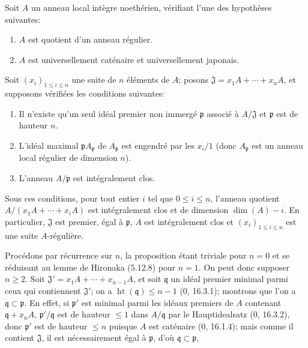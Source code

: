 \begin{corollary}[5.12.10]
\label{IV.2.s5.12.10-fr}
Soit $A$ un anneau local intègre noethérien, vérifiant l'une des hypothèses
suivantes:
\begin{enumerate}
\item[a)] $A$ est quotient d'un anneau régulier.
\item[b)] $A$ est universellement caténaire et universellement japonais.
\end{enumerate}
Soit $(x_i)_{1\leq i\leq n}$ une suite de $n$ éléments de $A$; posons
$\mathfrak J=x_1A+\cdots+x_nA$, et supposons vérifiées les conditions
suivantes:
\begin{enumerate}
\item[(i)] Il n'existe qu'un seul idéal premier non immergé $\mathfrak p$
associé à $A/\mathfrak J$ et $\mathfrak p$ est de hauteur $n$.
\item[(ii)] L'idéal maximal $\mathfrak pA_{\mathfrak p}$ de $A_{\mathfrak p}$
est engendré par les $x_i/1$ (donc $A_{\mathfrak p}$ est un anneau local
régulier de dimension $n$).
\item[(iii)] L'anneau $A/\mathfrak p$ est intégralement clos.
\end{enumerate}
Sous ces conditions, pour tout entier $i$ tel que $0\leq i\leq n$, l'anneau
quotient $A/(x_1A+\cdots+x_iA)$ est intégralement clos et de dimension
$\dim(A)-i$. En particulier, $\mathfrak J$ est premier, égal à $\mathfrak p$,
$A$ est intégralement clos et $(x_i)_{1\leq i\leq n}$ est une suite
$A$-régulière.
\end{corollary}

Procédons par récurrence sur $n$, la proposition étant triviale pour $n=0$ et
se réduisant au lemme de Hironaka (5.12.8) pour $n=1$. On peut donc supposer
$n\geq2$. Soit $\mathfrak J'=x_1A+\cdots+x_{n-1}A$, et soit $\mathfrak q$ un
idéal premier minimal parmi ceux qui contiennent $\mathfrak J'$; on a
$\operatorname{ht}(\mathfrak q)\leq n-1$ (0, 16.3.1); montrons que l'on a
$\mathfrak q\subset\mathfrak p$. En effet, si $\mathfrak p'$ est minimal parmi
les idéaux premiers de $A$ contenant $\mathfrak q+x_nA$,
$\mathfrak p'/\mathfrak q$ est de hauteur $\leq1$ dans $A/\mathfrak q$ par le
Hauptidealsatz (0, 16.3.2), donc $\mathfrak p'$ est de hauteur $\leq n$ puisque
$A$ est caténaire (0, 16.1.4); mais comme il contient $\mathfrak J$, il est
nécessairement égal à $\mathfrak p$, d'où
$\mathfrak q\subset\mathfrak p$,


